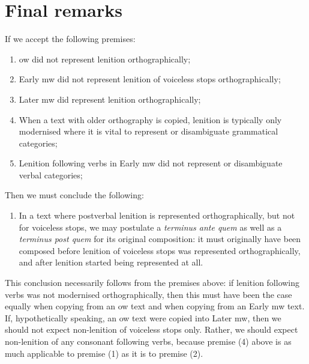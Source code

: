 \section{Final remarks}
If we accept the following premises:
\begin{enumerate}
\item \gls{ow} did not represent lenition orthographically;
\item Early \gls{mw} did not represent lenition of voiceless stops orthographically;
\item Later \gls{mw} did represent lenition orthographically;
\item When a text with older orthography is copied, lenition is typically only modernised where it is vital to represent or disambiguate grammatical categories;
\item Lenition following verbs in Early \gls{mw} did not represent or disambiguate verbal categories;
\end{enumerate}

Then we must conclude the following:
\begin{enumerate}
\item In a text where postverbal lenition is represented orthographically, but not for voiceless stops, we may postulate a \textit{terminus ante quem} as well as a \textit{terminus post quem} for its original composition: it must originally have been composed before lenition of voiceless stops was represented orthographically, and after lenition started being represented at all.
\end{enumerate}

This conclusion necessarily follows from the premises above: if lenition following verbs was not modernised orthographically, then this must have been the case equally when copying from an \gls{ow} text and when copying from an Early \gls{mw} text. If, hypothetically speaking, an \gls{ow} text were copied into Later \gls{mw}, then we should not expect non-lenition of voiceless stops only. Rather, we should expect non-lenition of any consonant following verbs, because premise (4) above is as much applicable to premise (1) as it is to premise (2).


